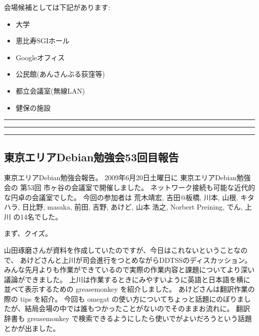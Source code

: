 \documentclass[mingoth,a4paper]{jsarticle}
\begin{document}
\begin{multicols}{2}
 会場候補としては下記があります:

 \begin{itemize}
  \item 大学
  \item 恵比寿SGIホール
  \item Googleオフィス
  \item 公民館(あんさんぶる荻窪等)
  \item 都立会議室(無線LAN)
  \item 健保の施設
 \end{itemize}

\end{multicols}


\newpage

\begin{minipage}[b]{0.2\hsize}
 \colorbox{titleback}{}
\end{minipage}
\begin{minipage}[b]{0.8\hsize}
\hrule
\vspace{2mm}
\hrule

\setcounter{tocdepth}{1}
\tableofcontents
\vspace{2mm}
\hrule
\end{minipage}

\subsection{東京エリアDebian勉強会53回目報告}

東京エリアDebian勉強会報告。
2009年6月20日土曜日に
東京エリアDebian勉強会の
第53回
市ヶ谷の会議室で開催しました。
ネットワーク接続も可能な近代的な円卓の会議室でした。
今回の参加者は
荒木靖宏, 吉田@板橋, 川本, 山根, キタハラ, 日比野, masaka, 前田, 吉野, あけど, 山本 浩之, Norbert Preining, でん, 上川
の14名でした。

まず、クイズ。

山田琢磨さんが資料を作成していたのですが、今日はこれないということなので、
あけどさんと上川が司会進行をつとめながらDDTSSのディスカッション。
みんな先月よりも作業ができているので実際の作業内容と課題についてより深い議論ができました。
上川は作業するときにみやすいように英語と日本語を横に並べて表示するための greasemonkey を紹介しました。
あけどさんは翻訳作業の際の tips を紹介。
今回も omegat の使い方についてちょっと話題にのぼりましたが、結局会場の中では誰もつかったことがないのでそのままお流れに。
翻訳辞書も greasemonkey で検索できるようにしたら使いでがよいだろうという話題とかが出ました。
\end{document}

